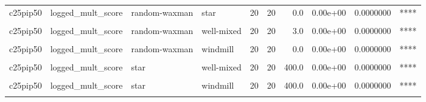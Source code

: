 \documentclass[
]{book}
\begin{document}
\begin{table}
\begin{tabular}{l|l|l|l|r|r|r|r|r|l}
\hline
\cellcolor{gray!6}{c25pip50} & \cellcolor{gray!6}{logged\_mult\_score} & \cellcolor{gray!6}{random-barabasi-albert} & \cellcolor{gray!6}{windmill} & \cellcolor{gray!6}{20} & \cellcolor{gray!6}{20} & \cellcolor{gray!6}{0.0} & \cellcolor{gray!6}{0.00e+00} & \cellcolor{gray!6}{0.0000000} & \cellcolor{gray!6}{****}\\
\hline
c25pip50 & logged\_mult\_score & random-waxman & star & 20 & 20 & 0.0 & 0.00e+00 & 0.0000000 & ****\\
\hline
\cellcolor{gray!6}{c25pip50} & \cellcolor{gray!6}{logged\_mult\_score} & \cellcolor{gray!6}{random-waxman} & \cellcolor{gray!6}{toroidal-lattice} & \cellcolor{gray!6}{20} & \cellcolor{gray!6}{20} & \cellcolor{gray!6}{0.0} & \cellcolor{gray!6}{0.00e+00} & \cellcolor{gray!6}{0.0000000} & \cellcolor{gray!6}{****}\\
\hline
c25pip50 & logged\_mult\_score & random-waxman & well-mixed & 20 & 20 & 3.0 & 0.00e+00 & 0.0000000 & ****\\
\hline
\cellcolor{gray!6}{c25pip50} & \cellcolor{gray!6}{logged\_mult\_score} & \cellcolor{gray!6}{random-waxman} & \cellcolor{gray!6}{wheel} & \cellcolor{gray!6}{20} & \cellcolor{gray!6}{20} & \cellcolor{gray!6}{0.0} & \cellcolor{gray!6}{0.00e+00} & \cellcolor{gray!6}{0.0000000} & \cellcolor{gray!6}{****}\\
\hline
c25pip50 & logged\_mult\_score & random-waxman & windmill & 20 & 20 & 0.0 & 0.00e+00 & 0.0000000 & ****\\
\hline
\cellcolor{gray!6}{c25pip50} & \cellcolor{gray!6}{logged\_mult\_score} & \cellcolor{gray!6}{star} & \cellcolor{gray!6}{toroidal-lattice} & \cellcolor{gray!6}{20} & \cellcolor{gray!6}{20} & \cellcolor{gray!6}{400.0} & \cellcolor{gray!6}{0.00e+00} & \cellcolor{gray!6}{0.0000000} & \cellcolor{gray!6}{****}\\
\hline
c25pip50 & logged\_mult\_score & star & well-mixed & 20 & 20 & 400.0 & 0.00e+00 & 0.0000000 & ****\\
\hline
\cellcolor{gray!6}{c25pip50} & \cellcolor{gray!6}{logged\_mult\_score} & \cellcolor{gray!6}{star} & \cellcolor{gray!6}{wheel} & \cellcolor{gray!6}{20} & \cellcolor{gray!6}{20} & \cellcolor{gray!6}{400.0} & \cellcolor{gray!6}{0.00e+00} & \cellcolor{gray!6}{0.0000000} & \cellcolor{gray!6}{****}\\
\hline
c25pip50 & logged\_mult\_score & star & windmill & 20 & 20 & 400.0 & 0.00e+00 & 0.0000000 & ****\\
\hline
\cellcolor{gray!6}{c25pip50} & \cellcolor{gray!6}{logged\_mult\_score} & \cellcolor{gray!6}{toroidal-lattice} & \cellcolor{gray!6}{well-mixed} & \cellcolor{gray!6}{20} & \cellcolor{gray!6}{20} & \cellcolor{gray!6}{82.0} & \cellcolor{gray!6}{1.00e-03} & \cellcolor{gray!6}{0.1430000} & \cellcolor{gray!6}{ns}\\

\end{tabular}
\end{table}
\end{document}
